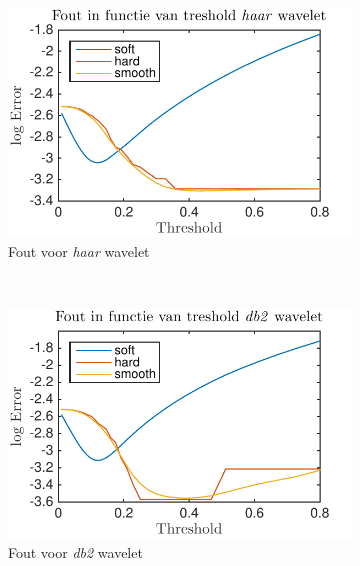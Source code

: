 \begin{figure}
    \centering
     \begin{subfigure}[b]{0.4\textwidth}
            \includegraphics[width=\textwidth]{../src/denoising/error_1d/error_exp_haar_10}
            \caption{Fout voor \textit{haar} wavelet}
        \end{subfigure}
        ~ %
        \begin{subfigure}[b]{0.4\textwidth}
            \includegraphics[width=\textwidth]{../src/denoising/error_1d/error_exp_db2_10}
            \caption{Fout voor \textit{db2} wavelet}
        \end{subfigure}
    \begin{subfigure}[b]{0.4\textwidth}

\end{subfigure}
\end{figure}
